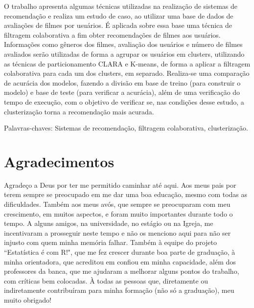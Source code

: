 \documentclass[12pt,a4paper,header]{abnt}
\begin{document}
\begin{resumo}

O trabalho apresenta algumas técnicas utilizadas na realização de sistemas de recomendação e realiza um estudo de caso, ao utilizar uma base de dados de avaliações de filmes por usuários. É aplicada sobre essa base uma técnica de filtragem colaborativa a fim obter recomendações de filmes aos usuários. Informações como gêneros dos filmes, avaliação dos usuários e número de filmes avaliados serão utilizadas de forma a agrupar os usuários em clusters, utilizando as técnicas de particionamento CLARA e K-means, de forma a aplicar a filtragem colaborativa para cada um dos clusters, em separado. Realiza-se uma comparação de acurácia dos modelos, fazendo a divisão em base de treino (para construir o modelo) e base de teste (para verificar a acurácia), além de uma verificação do tempo de execução, com o objetivo de verificar se, nas condições desse estudo, a clusterização torna a recomendação mais acurada.

\vspace{1cm}
\noindent Palavras-chaves:
Sistemas de recomendação, filtragem colaborativa, clusterização.

\end{resumo}

% 
% 
% 
\chapter*{Agradecimentos}

Agradeço a Deus por ter me permitido caminhar até aqui. Aos meus pais por terem sempre se preocupado em me dar uma boa educação, mesmo com todas as dificuldades. Também aos meus avós, que sempre se preocuparam com meu crescimento, em muitos aspectos, e foram muito importantes durante todo o tempo. A alguns amigos, na universidade, no estágio ou na Igreja, me incentivaram a prosseguir neste tempo e não os menciono aqui para não ser injusto com quem minha memória falhar. Também à equipe do projeto ``Estatística é com R!", que me fez crescer durante boa parte de graduação, à minha orientadora, que acreditou em confiou em minha capacidade, além dos professores da banca, que me ajudaram a melhorar alguns pontos do trabalho, com críticas bem colocadas. À todas as pessoas que, diretamente ou indiretamente contribuíram para minha formação (não só a graduação), meu muito obrigado!
\end{document}
